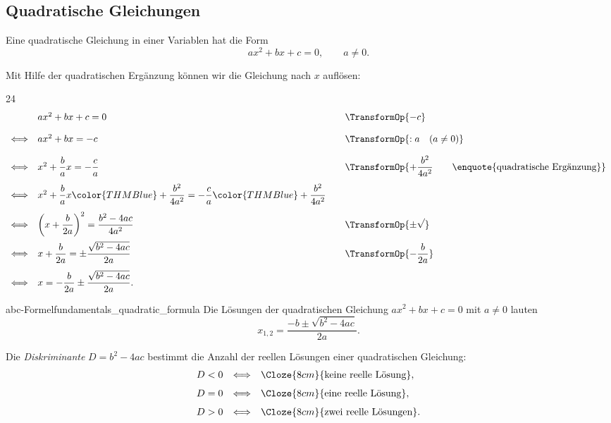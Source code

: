 \IfClozeTF{\clearpage}{\medskip}
\subsection{Quadratische Gleichungen}
\label{subsec:fundamentals_quadratic_equations}

Eine quadratische Gleichung in einer Variablen hat die Form
\[
  ax^2+bx+c=0, \qquad a\neq 0.
\]
\noindent\begin{minipage}{\linewidth}
  Mit Hilfe der quadratischen Ergänzung können wir die Gleichung nach $x$ auflösen:
  \begin{ClozeArea}[34]{24}
    \[
      \begin{array}{r@{\quad}l@{\qquad}l}
        & ax^2+bx+c=0
          & \TransformOp{-c} \\[1.1em]
        \Longleftrightarrow & ax^2+bx=-c
          & \TransformOp{:a \quad (a\neq0)} \\[1.1em]
        \Longleftrightarrow & x^2+\dfrac{b}{a}x=-\dfrac{c}{a}
          & \TransformOp{+\dfrac{b^2}{4a^2}
              \qquad\text{\enquote{quadratische Ergänzung}}} \\[1.1em]
        \Longleftrightarrow
          & x^2+\dfrac{b}{a}x{\color{THMBlue}+\dfrac{b^2}{4a^2}}
            =-\dfrac{c}{a}{\color{THMBlue}+\dfrac{b^2}{4a^2}}
          & \\[1.1em]
        \Longleftrightarrow
          & \left(x+\dfrac{b}{2a}\right)^2
            =\dfrac{b^2-4ac}{4a^2}
          & \TransformOp{\pm\sqrt{\vphantom{b^2}}} \\[1.1em]
        \Longleftrightarrow
          & x+\dfrac{b}{2a}
            =\pm\dfrac{\sqrt{b^2-4ac}}{2a}
          & \TransformOp{-\dfrac{b}{2a}} \\[1.1em]
        \Longleftrightarrow
          & x=-\dfrac{b}{2a}\pm\dfrac{\sqrt{b^2-4ac}}{2a}.
          &
      \end{array}
    \]
  \end{ClozeArea}
\end{minipage}

\begin{TheoremBox}{abc-Formel}{fundamentals_quadratic_formula}
  Die Lösungen der quadratischen Gleichung $ax^2+bx+c=0$ mit $a\neq0$ lauten
    \[
      x_{1,2}=\frac{-b\pm\sqrt{b^2-4ac}}{2a}.
    \]
\end{TheoremBox}

\begin{RemarkBox}[remark title=Diskriminante]
  Die \emph{Diskriminante} $D=b^2-4ac$ bestimmt die Anzahl der reellen
  Lösungen einer quadratischen Gleichung:
  \[
    \begin{array}{ccl}
      D<0 &\Longleftrightarrow& \Cloze{8cm}{\text{keine reelle Lösung}},\\[0.7em]
      D=0 &\Longleftrightarrow& \Cloze{8cm}{\text{eine reelle Lösung}},\\[0.7em]
      D>0 &\Longleftrightarrow& \Cloze{8cm}{\text{zwei reelle Lösungen}}.
    \end{array}
  \]
\end{RemarkBox}

